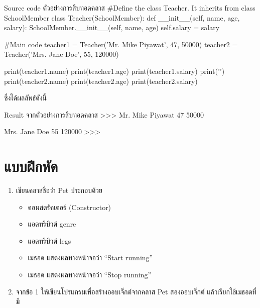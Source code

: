 \begin{codelist}{Source code ตัวอย่างการสืบทอดคลาส}{}
#Define the class Teacher. It inherits from class SchoolMember
class Teacher(SchoolMember):
    def __init__(self, name, age, salary):
        SchoolMember.__init__(self, name, age)
        self.salary = salary

#Main code
teacher1 = Teacher('Mr. Mike Piyawat', 47, 50000)
teacher2 = Teacher('Mrs. Jane Doe', 55, 120000)

print(teacher1.name)
print(teacher1.age)
print(teacher1.salary)
print('\n')
print(teacher2.name)
print(teacher2.age)
print(teacher2.salary)
\end{codelist}

ซึ่งได้ผลลัพธ์ดังนี้
\begin{codelist}{Result จากตัวอย่างการสืบทอดคลาส}{}
>>>
Mr. Mike Piyawat
47
50000


Mrs. Jane Doe
55
120000
>>> 
\end{codelist}


\section{แบบฝึกหัด}
\begin{enumerate} 
\item 	เขียนคลาสชื่อว่า Pet ประกอบด้วย
	\begin{itemize}
	\item 	คอนสตรัคเตอร์ (Constructor)
	\item 	แอตทริบิวต์ genre
	\item 	แอตทริบิวต์ legs
	\item 	เมธอด  แสดงผลทางหน้าจอว่า “Start running”
	\item 	เมธอด  แสดงผลทางหน้าจอว่า “Stop running”
	\end{itemize}
\item 	 จากข้อ 1 ให้เขียนโปรแกรมเพื่อสร้างออบเจ็กต์จากคลาส Pet สองออบเจ็กต์ แล้วเรียกใช้เมธอดที่มี
\end{enumerate}
